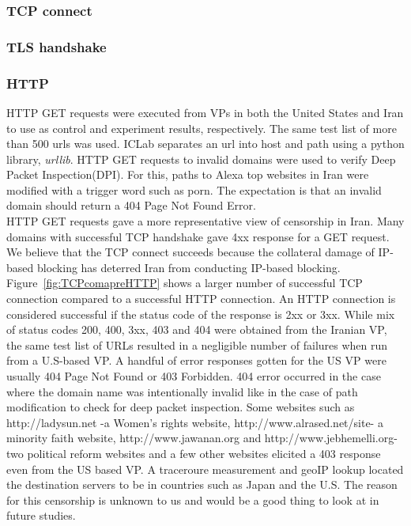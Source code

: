 \subsubsection{TCP connect} 
\subsubsection{TLS handshake}
\subsubsection{HTTP}
 HTTP GET requests were executed from VPs  in both the United States and Iran to use as control and experiment results, respectively. The same test list of more than 500 urls was used. ICLab separates an url into host and path using a python library, \textit{urllib}. HTTP GET requests to invalid domains were used to verify Deep Packet Inspection(DPI). For this, paths to Alexa top websites in Iran were modified with a trigger word such as porn. The expectation is that an invalid domain should return a 404 Page Not Found Error.\\
HTTP GET requests gave a more representative view of censorship in Iran. Many domains with successful TCP handshake gave 4xx response for a GET request. We believe that  the TCP connect succeeds because the collateral damage of IP-based blocking has deterred Iran from conducting IP-based blocking. Figure~\ref{fig:TCPcomapreHTTP} shows a larger number of successful TCP connection compared to a successful HTTP connection. An HTTP connection is considered successful if the status code of the response is 2xx or 3xx. While mix of status codes 200, 400, 3xx, 403 and 404 were obtained from the Iranian VP, the same test list of URLs resulted in a negligible number of failures when run from a U.S-based VP.  A handful of error responses gotten for the US VP were usually  404 Page Not Found or 403 Forbidden. 404 error occurred in the case where the domain name was intentionally invalid like in the case of path modification to check for deep packet inspection. Some websites such as http://ladysun.net -a Women's rights website, http://www.alrased.net/site- a minority faith website, http://www.jawanan.org and http://www.jebhemelli.org- two political reform websites and a few other websites elicited a 403 response even from the US based VP. A traceroure measurement and geoIP lookup located the destination servers to be in countries such as  Japan and the U.S.  The reason for this censorship is unknown to us and would be a good thing to look at in future studies.\\
